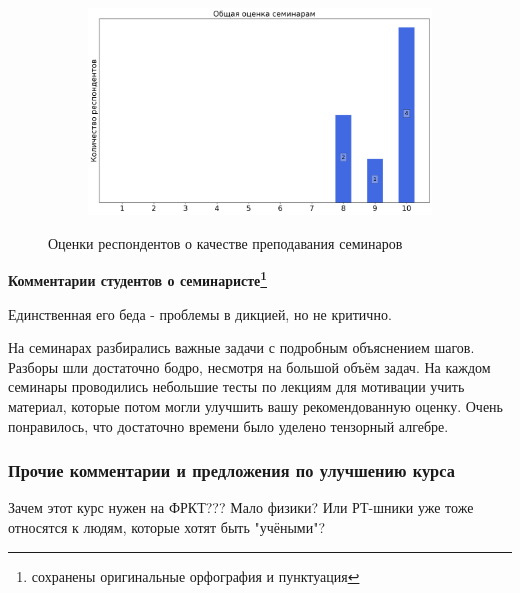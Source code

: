 \begin{figure}[H]
\begin{subfigure}[b]{0.45\textwidth}
			\end{subfigure}
			\begin{subfigure}[b]{0.45\textwidth}
				\centering
				\includegraphics[width=\textwidth]{images/3 course/Теория поля/seminarists-marks-Фомичев С.В.-3.png}
			\end{subfigure}	
			\caption{Оценки респондентов о качестве преподавания семинаров}
		\end{figure}

		\textbf{Комментарии студентов о семинаристе\protect\footnote{сохранены оригинальные орфография и пунктуация}}
            \begin{commentbox} 
                Единственная его беда - проблемы в дикцией, но не критично. 
            \end{commentbox} 
        
            \begin{commentbox} 
                На семинарах разбирались важные задачи с подробным объяснением шагов. Разборы шли достаточно бодро, несмотря на большой объём задач. На каждом семинары проводились небольшие тесты по лекциям для мотивации учить материал, которые потом могли улучшить вашу рекомендованную оценку. Очень понравилось, что достаточно времени было уделено тензорный алгебре. 
            \end{commentbox} 

    
    \subsubsection{Прочие комментарии и предложения по улучшению курса}
		\begin{commentbox}
			Зачем этот курс нужен на ФРКТ??? Мало физики? Или РТ-шники уже тоже относятся к людям, которые хотят быть "учёными"?
		\end{commentbox}

